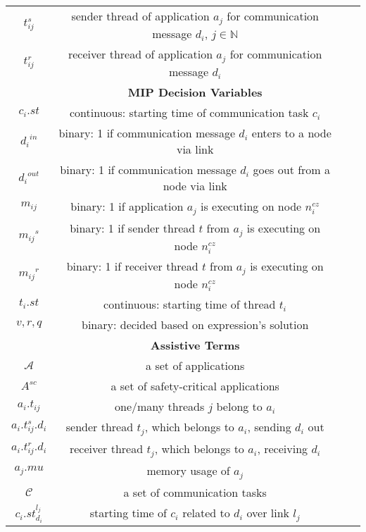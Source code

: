 \begin{longtable}{@{}c c c c@{}}
    			$t_{i{j}}^{s}$ & sender thread of application $a_j$ for communication message $d_i$, $j\in \mathbb{N}$ \\[0.1cm]
    			$t_{i{j}}^{r}$ & receiver thread of application $a_j$ for communication message $d_i$\\[0.1cm]
    			\bottomrule
    			\toprule
    			&\textbf {MIP Decision Variables}\\
    			\midrule
    			$c_i.st$ & continuous: starting time of communication task $c_i$\\[0.1cm]
    			${d_i}^{in}$ & binary: 1 if communication message $d_i$ enters to a node via link\\[0.1cm]
    			${d_i}^{out}$ & binary: 1 if communication message $d_i$ goes out from a node via link\\[0.1cm]
    			${m_{ij}}$ & binary: 1 if application $a_j$ is executing on node $n_{i}^{cz}$\\[0.1cm]
    			${m_{ij}}^{s}$ & binary: 1 if sender thread $t$ from $a_j$ is executing on node $n_{i}^{cz}$\\[0.1cm]
    			${m_{ij}}^{r}$ & binary: 1 if receiver thread $t$ from $a_j$ is executing on node $n_{i}^{cz}$\\[0.1cm]
    			$t_i.st$ & continuous: starting time of thread $t_i$\\[0.1cm]
    			$v, r, q$ & binary: decided based on expression's solution \\[0.1cm]
    			\bottomrule
    			\toprule
    			&\textbf {Assistive Terms}\\
    			\midrule
    			$\mathcal{A}$ & a set of applications\\[0.1cm]
    			$A^{sc}$ & a set of safety-critical applications\\[0.1cm]
    			$a_i.t_{ij}$ & one/many threads $j$ belong to $a_i$\\[0.1cm]
    			$a_i.t_{ij}^{s}.d_i$ & sender thread $t_j$, which belongs to $a_i$, sending $d_i$ out\\[0.1cm]
    			$a_i.t_{ij}^{r}.d_i$ & receiver thread $t_j$, which belongs to $a_i$, receiving $d_i$\\[0.1cm]
    			$a_j.mu$ & memory usage of $a_j$ \\[0.1cm]
    			$\mathcal{C}$ & a set of communication tasks\\[0.1cm]
    			$c_i.st_{d_i}^{l_{j}}$ & starting time of $c_i$ related to $d_i$ over link $l_j$\\[0.1cm]

\end{longtable}
